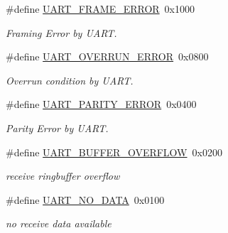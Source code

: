 \begin{DoxyCompactItemize}
\mbox{\label{group__pfleury__uart_gabcdb1041d763560cd8f8e722370dfd37}} 
\#define \hyperlink{group__pfleury__uart_gabcdb1041d763560cd8f8e722370dfd37}{U\+A\+R\+T\+\_\+\+F\+R\+A\+M\+E\+\_\+\+E\+R\+R\+OR}~0x1000
\begin{DoxyCompactList}\small\item\em Framing Error by U\+A\+RT. \end{DoxyCompactList}\item 
\mbox{\label{group__pfleury__uart_ga3183177e3613d8785d8cc8516931beb6}} 
\#define \hyperlink{group__pfleury__uart_ga3183177e3613d8785d8cc8516931beb6}{U\+A\+R\+T\+\_\+\+O\+V\+E\+R\+R\+U\+N\+\_\+\+E\+R\+R\+OR}~0x0800
\begin{DoxyCompactList}\small\item\em Overrun condition by U\+A\+RT. \end{DoxyCompactList}\item 
\mbox{\label{group__pfleury__uart_ga946e3d317937e003d2057bf19e96dd1d}} 
\#define \hyperlink{group__pfleury__uart_ga946e3d317937e003d2057bf19e96dd1d}{U\+A\+R\+T\+\_\+\+P\+A\+R\+I\+T\+Y\+\_\+\+E\+R\+R\+OR}~0x0400
\begin{DoxyCompactList}\small\item\em Parity Error by U\+A\+RT. \end{DoxyCompactList}\item 
\mbox{\label{group__pfleury__uart_ga94758f3dad6864703b7417d3e40f11df}} 
\#define \hyperlink{group__pfleury__uart_ga94758f3dad6864703b7417d3e40f11df}{U\+A\+R\+T\+\_\+\+B\+U\+F\+F\+E\+R\+\_\+\+O\+V\+E\+R\+F\+L\+OW}~0x0200
\begin{DoxyCompactList}\small\item\em receive ringbuffer overflow \end{DoxyCompactList}\item 
\mbox{\label{group__pfleury__uart_ga77ba544d423ff42d400220a05303f268}} 
\#define \hyperlink{group__pfleury__uart_ga77ba544d423ff42d400220a05303f268}{U\+A\+R\+T\+\_\+\+N\+O\+\_\+\+D\+A\+TA}~0x0100
\begin{DoxyCompactList}\small\item\em no receive data available \end{DoxyCompactList}\item 

\end{DoxyCompactItemize}
